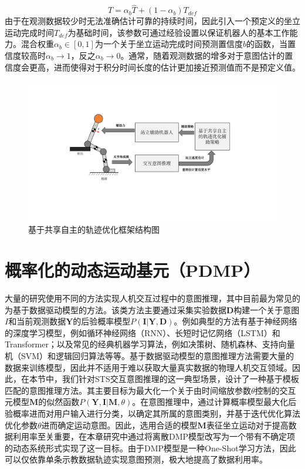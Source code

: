 \begin{equation}
    T=\alpha_b \hat T + (1-\alpha_b)T_{def}
    \label{eq:4-6}
\end{equation}
由于在观测数据较少时无法准确估计可靠的持续时间，因此引入一个预定义的坐立运动完成时间$T_{def}$为基础时间，该参数可通过经验设置以保证机器人的基本工作能力。混合权重$\alpha_b \in [0,1]$为一个关于坐立运动完成时间预测置信度$b$的函数，当置信度较高时$\alpha_b \rightarrow 1$，反之$\alpha_b \rightarrow 0$。通常，随着观测数据的增多对于意图估计的置信度会更高，进而使得对于积分时间长度的估计更加接近预测值而不是预定义值。

\begin{figure}[htb]
    \centering\includegraphics[width=1\textwidth]{figures/4-Fig-2.pdf}
    \caption{基于共享自主的轨迹优化框架结构图}
    \label{fig:4-2}
\end{figure}

\section{概率化的动态运动基元（PDMP）} 
大量的研究使用不同的方法实现人机交互过程中的意图推理，其中目前最为常见的为基于数据驱动模型的方法。该类方法主要通过采集实验数据$\mathbf{D}$构建一个关于意图$I$和当前观测数据$\mathbf{Y}$的后验概率模型$P(\mathbf{I}|\mathbf{Y},\mathbf{D})$。例如典型的方法有基于神经网络的深度学习模型，例如循环神经网络（RNN）、长短时记忆网络（LSTM）和Transformer；以及常见的经典机器学习算法，例如决策树、随机森林、支持向量机（SVM）和逻辑回归算法等等。基于数据驱动模型的意图推理方法需要大量的数据来训练模型，因此并不适用于难以获取大量真实数据的物理人机交互领域。因此，在本节中，我们针对STS交互意图推理的这一典型场景，设计了一种基于模板匹配的意图推理方法。其主要目标为最大化一个关于由时间缩放参数$\theta$控制的交互元模型$\mathbf{M}$的似然函数$P(\mathbf{Y},\mathbf{I}|\mathbf{M},\theta)$。在意图推理中，通过计算概率模型最大化后验概率进而对用户输入进行分类，以确定其所属的意图类别，并基于迭代优化算法优化参数$\theta$进而确定运动意图。因此，选用合适的模型$\mathbf{M}$表征坐立运动对于提高数据利用率至关重要，在本章研究中通过将离散DMP模型改写为一个带有不确定项的动态系统形式实现了这一目标。由于DMP模型是一种One-Shot学习方法，因此可以仅依靠单条示教数据轨迹实现意图预测，极大地提高了数据利用率。


